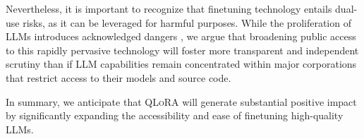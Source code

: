 Nevertheless, it is important to recognize that finetuning technology entails dual-use risks, as it can be leveraged for harmful purposes. While the proliferation of LLMs introduces acknowledged dangers \citep{bommasani2021opportunities,bender2021dangers}, we argue that broadening public access to this rapidly pervasive technology will foster more transparent and independent scrutiny than if LLM capabilities remain concentrated within major corporations that restrict access to their models and source code.

In summary, we anticipate that \textsc{QLoRA} will generate substantial positive impact by significantly expanding the accessibility and ease of finetuning high-quality LLMs.